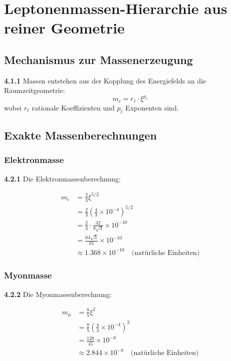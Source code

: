 \documentclass[12pt,a4paper]{article}
\newcommand{\xipar}{\xi}
\begin{document}
	\section{Leptonenmassen-Hierarchie aus reiner Geometrie}
	
	\subsection{Mechanismus zur Massenerzeugung}
	
	\noindent \textbf{4.1.1} Massen entstehen aus der Kopplung des Energiefelds an die Raumzeitgeometrie:
	\begin{equation}
		m_{\ell} = r_{\ell} \cdot \xipar^{p_{\ell}}
	\end{equation}
	wobei $r_{\ell}$ rationale Koeffizienten und $p_{\ell}$ Exponenten sind.
	
	\subsection{Exakte Massenberechnungen}
	
	\subsubsection{Elektronmasse}
	
	\noindent \textbf{4.2.1} Die Elektronmassenberechnung:
	\begin{keyresult}
		\begin{align}
			m_e &= \frac{2}{3} \xipar^{5/2} \\
			&= \frac{2}{3} \left( \frac{4}{3} \times 10^{-4} \right)^{5/2} \\
			&= \frac{2}{3} \cdot \frac{32}{9 \sqrt{3}} \times 10^{-10} \\
			&= \frac{64 \sqrt{3}}{81} \times 10^{-10} \\
			&\approx 1.368 \times 10^{-10} \quad \text{(natürliche Einheiten)}
		\end{align}
	\end{keyresult}
	
	\subsubsection{Myonmasse}
	
	\noindent \textbf{4.2.2} Die Myonmassenberechnung:
	\begin{keyresult}
		\begin{align}
			m_\mu &= \frac{8}{5} \xipar^{2} \\
			&= \frac{8}{5} \left( \frac{4}{3} \times 10^{-4} \right)^{2} \\
			&= \frac{128}{45} \times 10^{-8} \\
			&\approx 2.844 \times 10^{-8} \quad \text{(natürliche Einheiten)}
		\end{align}
	\end{keyresult}
	
\end{document}
